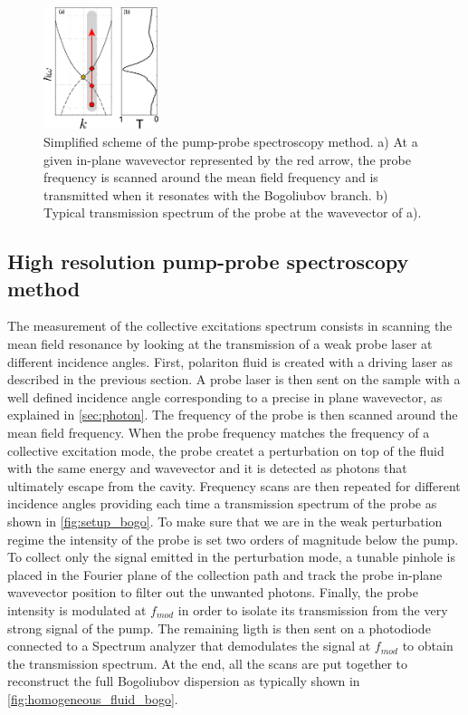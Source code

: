 \begin{figure}[h]
    \centering
    \includegraphics[width=0.3\textwidth]{chap_custom_st/fig/setup_bogoliubov.pdf}
    \caption{Simplified scheme of the pump-probe spectroscopy method. a) At a given in-plane wavevector represented by the red arrow, the probe frequency is scanned around the mean field frequency and is transmitted when it resonates with the Bogoliubov branch. b) Typical transmission spectrum of the probe at the wavevector of a).}
    \label{fig:setup_bogo}
\end{figure}


\subsection{High resolution pump-probe spectroscopy method}

\label{sub:high_resolution_spectroscopy}

The measurement of the collective excitations spectrum consists in scanning the mean field resonance by looking at the transmission of a weak probe laser at different incidence angles. First, polariton fluid is created with a driving laser as described in the previous section. A probe laser is then sent on the sample with a well defined incidence angle corresponding to a precise in plane wavevector, as explained in \autoref{sec:photon}. The frequency of 
the probe is then scanned around the mean field frequency. When the probe frequency matches the frequency of a collective excitation mode, the probe createt a perturbation on top of the fluid with the same energy and wavevector  and it is detected as photons that ultimately escape from the cavity. Frequency scans are then repeated for different incidence angles providing each time a transmission spectrum of the probe as shown in \autoref{fig:setup_bogo}. 
To make sure that we are in the weak perturbation regime the intensity of the probe is set two orders of magnitude below the pump. To collect only the signal emitted in the perturbation mode, a tunable pinhole is placed in the Fourier plane of the collection path and track the probe in-plane wavevector position to filter out the unwanted photons. Finally, the probe intensity is modulated at $f_{mod}$ in order to isolate its transmission from the very strong signal of the pump. The remaining ligth is then sent on
a photodiode connected to a Spectrum analyzer that demodulates the signal at $f_{mod}$ to obtain the transmission spectrum. At the end, all the scans are put together to reconstruct the full Bogoliubov dispersion as typically shown in \autoref{fig:homogeneous_fluid_bogo}.



